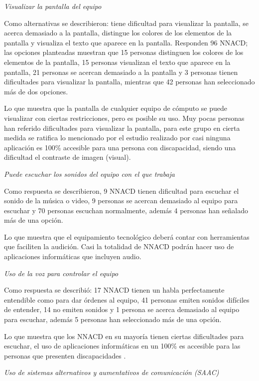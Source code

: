\documentclass[spanish]{textolivre}
\begin{document}
\textit{Visualizar la pantalla del equipo}

Como alternativas se describieron: tiene dificultad para visualizar la pantalla, se acerca demasiado a la pantalla, distingue los colores de los elementos de la pantalla y visualiza el texto que aparece en la pantalla. Responden 96 NNACD; las opciones planteadas muestran que 15 personas distinguen los colores de los elementos de la pantalla, 15 personas visualizan el texto que aparece en la pantalla, 21 personas se acercan demasiado a la pantalla y 3 personas tienen dificultades para visualizar la pantalla, mientras que 42 personas han seleccionado más de dos opciones.

Lo que muestra que la pantalla de cualquier equipo de cómputo se puede visualizar con ciertas restricciones, pero es posible su uso. Muy pocas personas han referido dificultades para visualizar la pantalla, para este grupo en cierta medida se ratifica lo mencionado por el estudio realizado por \textcite{acosta-vargas_accessibility_2021} casi ninguna aplicación es 100\% accesible para una persona con discapacidad, siendo una dificultad el contraste de imagen (visual).

\textit{Puede escuchar los sonidos del equipo con el que trabaja}

Como respuesta se describieron, 9 NNACD tienen dificultad para escuchar el sonido de la música o video, 9 personas se acercan demasiado al equipo para escuchar y 70 personas escuchan normalmente, además 4 personas han señalado más de una opción.

Lo que muestra que el equipamiento tecnológico deberá contar con herramientas que faciliten la audición. Casi la totalidad de NNACD podrán hacer uso de aplicaciones informáticas que incluyen audio.

\textit{Uso de la voz para controlar el equipo}

Como respuesta se describió: 17 NNACD tienen un habla perfectamente entendible como para dar órdenes al equipo, 41 personas emiten sonidos difíciles de entender, 14 no emiten sonidos y 1 persona se acerca demasiado al equipo para escuchar, además 5 personas han seleccionado más de una opción.

Lo que muestra que los NNACD en su mayoría tienen ciertas dificultades para escuchar, el uso de aplicaciones informáticas en un 100\% es accesible para las personas que presenten discapacidades \cite{acosta-vargas_accessibility_2021}.

\textit{Uso de sistemas alternativos y aumentativos de comunicación (SAAC)}
\end{document}
